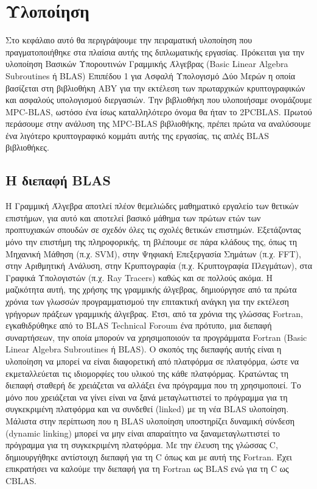 \chapter{Υλοποίηση}
\label{chapter:implementation}

Στο κεφάλαιο αυτό θα περιγράψουμε την πειραματική υλοποίηση που πραγματοποιήθηκε στα πλαίσια αυτής της διπλωματικής εργασίας. Πρόκειται για την υλοποίηση Βασικών Υπορουτινών Γραμμικής Άλγεβρας (Basic Linear Algebra Subroutines ή BLAS) Επιπέδου 1 για Ασφαλή Υπολογισμό Δύο Μερών η οποία βασίζεται στη βιβλιοθήκη ABY για την εκτέλεση των πρωταρχικών κρυπτογραφικών και ασφαλούς υπολογισμού διεργασιών. Την βιβλιοθήκη που υλοποιήσαμε ονομάζουμε MPC-BLAS, ωστόσο ένα ίσως καταλληλότερο όνομα θα ήταν το 2PCBLAS. Πρωτού περάσουμε στην ανάλυση της MPC-BLAS βιβλιοθήκης, πρέπει πρώτα να αναλύσουμε ένα λιγότερο κρυπτογραφικό κομμάτι αυτής της εργασίας, τις απλές BLAS βιβλιοθήκες.


\section{Η διεπαφή BLAS}

Η Γραμμική Άλγεβρα αποτλεί πλέον θεμελιώδες μαθηματικό εργαλείο των θετικών επιστήμων, για αυτό και αποτελεί βασικό μάθημα των πρώτων ετών των προπτυχιακών σπουδών σε σχεδόν όλες τις σχολές θετικών επιστημών. Εξετάζοντας μόνο την επιστήμη της πληροφορικής, τη βλέπουμε σε πάρα κλάδους της, όπως τη Μηχανική Μάθηση (π.χ. SVM), στην Ψηφιακή Επεξεργασία Σημάτων (π.χ. FFT), στην Αριθμητική Ανάλυση, στην Κρυπτογραφία (π.χ. Κρυπτογραφία Πλεγμάτων), στα Γραφικά Υπολογιστών (π.χ. Ray Tracers) καθώς και σε πολλούς ακόμα.
Η μαζικότητα αυτή, της χρήσης της γραμμικής άλγεβρας, δημιούργησε από τα πρώτα χρόνια των γλωσσών προγραμματισμού την επιτακτική ανάγκη για την εκτέλεση γρήγορων πράξεων γραμμικής άλγεβρας. Έτσι, από τα χρόνια της γλώσσας Fortran, εγκαθιδρύθηκε από το BLAS Technical Foroum ένα πρότυπο, μια διεπαφή συναρτήσεων, την οποία μπορούν να χρησιμοποιούν τα προγράμματα Fortran (Basic Linear Algebra Subroutines ή BLAS). Ο σκοπός της διεπαφής αυτής είναι η υλοποίηση να μπορεί να είναι διαφορετική
από πλατφόρμα σε πλατφόρμα, ώστε να εκμεταλλεύεται τις ιδιομορφίες του υλικού της κάθε πλατφόρμας. Κρατώντας τη διεπαφή σταθερή δε χρειάζεται να αλλάξει ένα πρόγραμμα που τη χρησιμοποιεί. Το μόνο που χρειάζεται να γίνει είναι να ξανά μεταγλωττιστεί το πρόγραμμα για τη συγκεκριμένη πλατφόρμα και να συνδεθεί (linked) με τη νέα BLAS υλοποίηση. Μάλιστα στην περίπτωση που η BLAS υλοποίηση υποστηρίζει δυναμική σύνδεση (dynamic linking) μπορεί να μην είναι απαραίτητο να ξαναμεταγλωττιστεί το πρόγραμμα για τη συγκεκριμένη πλατφόρμα. Με την έλευση της γλώσσας C, δημιουργήθηκε αντίστοιχη διεπαφή για τη C όπως και με αυτή της Fortran. Έχει επικρατήσει να καλούμε την διεπαφή για τη Fortran ως BLAS ενώ για τη C ως CBLAS.

